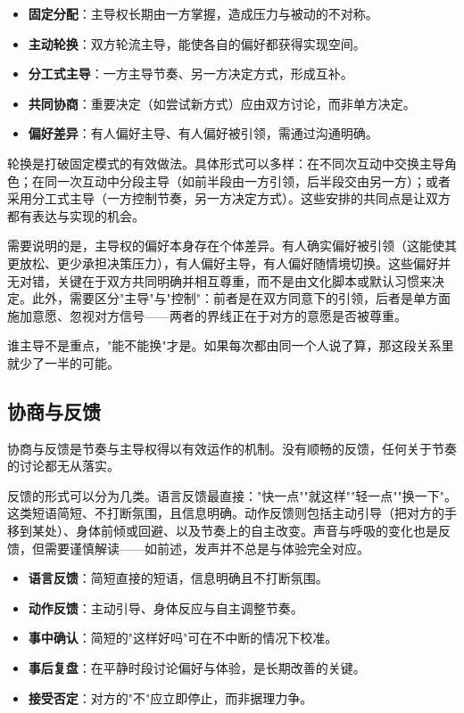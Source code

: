 \documentclass[12pt,UTF8]{ctexbook}
\newcommand{\keyword}[1]{\textbf{#1}}
\begin{document}
\begin{itemize}
  \item \keyword{固定分配}：主导权长期由一方掌握，造成压力与被动的不对称。
  \item \keyword{主动轮换}：双方轮流主导，能使各自的偏好都获得实现空间。
  \item \keyword{分工式主导}：一方主导节奏、另一方决定方式，形成互补。
  \item \keyword{共同协商}：重要决定（如尝试新方式）应由双方讨论，而非单方决定。
  \item \keyword{偏好差异}：有人偏好主导、有人偏好被引领，需通过沟通明确。
\end{itemize}

轮换是打破固定模式的有效做法。具体形式可以多样：在不同次互动中交换主导角色；在同一次互动中分段主导（如前半段由一方引领，后半段交由另一方）；或者采用分工式主导（一方控制节奏，另一方决定方式）。这些安排的共同点是让双方都有表达与实现的机会。

需要说明的是，主导权的偏好本身存在个体差异。有人确实偏好被引领（这能使其更放松、更少承担决策压力），有人偏好主导，有人偏好随情境切换。这些偏好并无对错，关键在于双方共同明确并相互尊重，而不是由文化脚本或默认习惯来决定。此外，需要区分"主导"与"控制"：前者是在双方同意下的引领，后者是单方面施加意愿、忽视对方信号——两者的界线正在于对方的意愿是否被尊重。

\begin{tcolorbox}[colback=pink!5!white,colframe=red!50!black,title=贴心小叮咛]
谁主导不是重点，"能不能换"才是。如果每次都由同一个人说了算，那这段关系里就少了一半的可能。
\end{tcolorbox}
\subsection{协商与反馈}

协商与反馈是节奏与主导权得以有效运作的机制。没有顺畅的反馈，任何关于节奏的讨论都无从落实。

反馈的形式可以分为几类。语言反馈最直接："快一点""就这样""轻一点""换一下"。这类短语简短、不打断氛围，且信息明确。动作反馈则包括主动引导（把对方的手移到某处）、身体前倾或回避、以及节奏上的自主改变。声音与呼吸的变化也是反馈，但需要谨慎解读——如前述，发声并不总是与体验完全对应。

\begin{itemize}
  \item \keyword{语言反馈}：简短直接的短语，信息明确且不打断氛围。
  \item \keyword{动作反馈}：主动引导、身体反应与自主调整节奏。
  \item \keyword{事中确认}：简短的"这样好吗"可在不中断的情况下校准。
  \item \keyword{事后复盘}：在平静时段讨论偏好与体验，是长期改善的关键。
  \item \keyword{接受否定}：对方的"不"应立即停止，而非据理力争。
\end{itemize}
\end{document}

